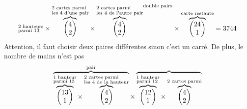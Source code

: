 \documentclass{book}
\begin{document}
\begin{Exercice}[Poker]
\begin{Correction}
\begin{enumerate}
$${{\begin{subarray}{l}\text{2 hauteurs}\\
    \text{parmi 13}\end{subarray}}
\times    \overbrace{\begin{pmatrix}4\\2\end{pmatrix}}^{\begin{subarray}{l}\text{2 cartes parmi}\\
    \text{les 4 d'une pair}\end{subarray}}
\times    \overbrace{\begin{pmatrix}4\\2\end{pmatrix}}^{\begin{subarray}{l}\text{2 cartes parmi}\\
    \text{les 4 de l'autre pair}\end{subarray}}}^{\text{double pairs}}
    \times    \overbrace{\begin{pmatrix}24\\1\end{pmatrix}}^{\text{carte restante}}=3744
$$
Attention, il faut choisir deux paires différentes sinon
c'est un carré. De plus, le nombre de mains n'est pas 
$$
\overbrace{\overbrace{\begin{pmatrix}13\\1\end{pmatrix}}^
{\begin{subarray}{l}\text{1 hauteur}\\
    \text{parmi 13}\end{subarray}}
\times    \overbrace{\begin{pmatrix}4\\2\end{pmatrix}}^{\begin{subarray}{l}\text{2 cartes parmi}\\
    \text{les 4 de la hauteur}\end{subarray}}}^{\text{pair}}
\times\overbrace{\overbrace{\begin{pmatrix}12\\1\end{pmatrix}}^
{\begin{subarray}{l}\text{1 hauteur}\\
    \text{parmi 12}\end{subarray}}
\times    \overbrace{\begin{pmatrix}4\\2\end{pmatrix}}^{\begin{subarray}{l}\text{2 cartes parmi}\\

\end{subarray}}}$$
\end{enumerate}
\end{Correction}
\end{Exercice}
\end{document}
